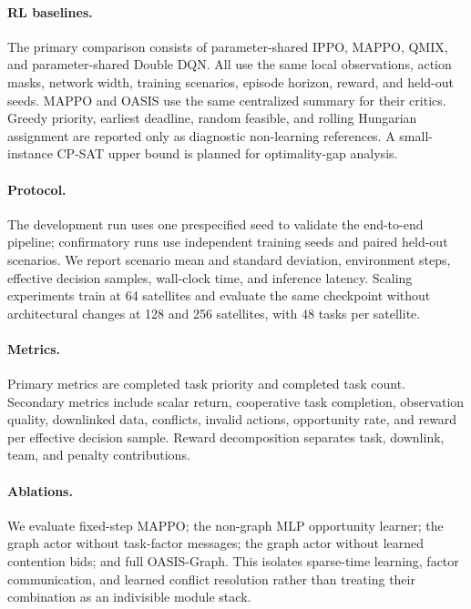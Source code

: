 \documentclass[letterpaper]{article}
\begin{document}
\paragraph{RL baselines.}
The primary comparison consists of parameter-shared IPPO, MAPPO, QMIX, and parameter-shared Double DQN.  All use the same local observations, action masks, network width, training scenarios, episode horizon, reward, and held-out seeds.  MAPPO and OASIS use the same centralized summary for their critics.  Greedy priority, earliest deadline, random feasible, and rolling Hungarian assignment are reported only as diagnostic non-learning references.  A small-instance CP-SAT upper bound is planned for optimality-gap analysis.

\paragraph{Protocol.}
The development run uses one prespecified seed to validate the end-to-end pipeline; confirmatory runs use independent training seeds and paired held-out scenarios.  We report scenario mean and standard deviation, environment steps, effective decision samples, wall-clock time, and inference latency.  Scaling experiments train at 64 satellites and evaluate the same checkpoint without architectural changes at 128 and 256 satellites, with 48 tasks per satellite.

\paragraph{Metrics.}
Primary metrics are completed task priority and completed task count.  Secondary metrics include scalar return, cooperative task completion, observation quality, downlinked data, conflicts, invalid actions, opportunity rate, and reward per effective decision sample.  Reward decomposition separates task, downlink, team, and penalty contributions.

\paragraph{Ablations.}
We evaluate fixed-step MAPPO; the non-graph MLP opportunity learner; the graph actor without task-factor messages; the graph actor without learned contention bids; and full OASIS-Graph.  This isolates sparse-time learning, factor communication, and learned conflict resolution rather than treating their combination as an indivisible module stack.
\end{document}

